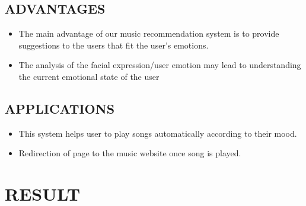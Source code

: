 \documentclass[12pt]{report}
\begin{document}
\vspace{0.5cm}
\normalsize
\subsection{  ADVANTAGES}
\begin{itemize}
\item The main advantage of our music recommendation system is to provide 
suggestions to the users that fit the user's emotions.\\
\item The analysis of the facial expression/user emotion may lead to understanding the 
current emotional state of the user
\end{itemize}

\vspace{1.5cm}
\normalsize
\subsection{  APPLICATIONS}
\begin{itemize}
\item This system helps user to play songs automatically according to their mood.\\
\item Redirection of page to the music website once song is played.

\end{itemize}
\clearpage

\centering
\section{RESULT}

\justifying
\setlength{\parindent}{4em}
\setlength{\parskip}{0.5em}
\renewcommand{\baselinestretch}{1.5}
\vspace{1cm}



\vspace{1cm}


\vspace{1.5cm}


\vspace{1cm}


\vspace{1.5cm}


\vspace{1cm}


\vspace{1cm}


\vspace{1.5cm}
\end{document}

